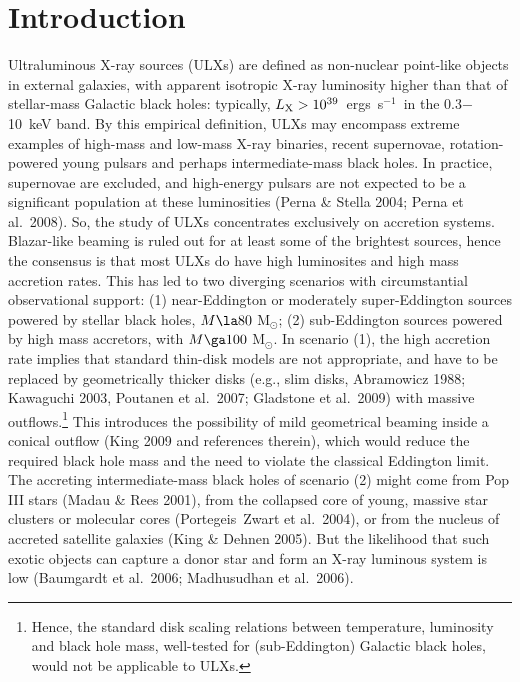 \documentclass{article}
\newcommand{\msun}{M$_{\odot}$}
\newcommand{\ergl}{ergs~s$^{-1}$}
\newcommand{\etal}{et al.}
\begin{document}

\section{Introduction}

Ultraluminous X-ray sources (ULXs) 
 are defined as non-nuclear point-like objects in external galaxies,
with apparent isotropic X-ray luminosity higher than that of stellar-mass
Galactic black holes: typically, $L_{\rm X} > 10^{39}$~\ergl\
in the 0.3$-$10~keV band. By this empirical definition, ULXs
may encompass extreme examples of high-mass and low-mass X-ray
binaries, recent supernovae, rotation-powered young pulsars
and perhaps intermediate-mass black holes. In practice, supernovae
are excluded, and high-energy pulsars are not expected to be a significant
population at these luminosities (Perna \& Stella 2004; Perna \etal\ 2008). 
So, the study of ULXs concentrates
exclusively on accretion systems. Blazar-like beaming is ruled out
for at least some of the brightest sources,
hence the consensus is that most ULXs do have high luminosites
and high mass accretion rates. This has led to two diverging scenarios
with circumstantial observational support: 
(1) near-Eddington or moderately super-Eddington sources powered
by stellar black holes, $M \la 80$ \msun;
(2) sub-Eddington sources
powered by high mass accretors, with $M \ga 100$ \msun.
%
In scenario (1), the high accretion rate implies that
standard thin-disk models are not appropriate, and have to be
replaced by geometrically thicker disks (e.g., slim disks, Abramowicz 1988; Kawaguchi 2003,
 Poutanen \etal\ 2007; Gladstone \etal\ 2009)
with massive 
outflows.\footnote{Hence, the standard disk scaling relations between temperature, luminosity
and black hole mass, well-tested for (sub-Eddington) Galactic black holes,
would not be applicable to ULXs.}
%
This introduces the possibility of mild
geometrical beaming inside a conical outflow (King 2009 and references therein), which
would reduce the required black hole mass and the need to violate
the classical Eddington limit.
%
The accreting intermediate-mass black holes
of scenario (2) might come from Pop III stars (Madau \& Rees 2001), from the collapsed
core of young, massive star clusters or molecular cores (Portegeis~Zwart \etal\ 2004),
or from the nucleus of accreted satellite galaxies (King \& Dehnen 2005).
But the likelihood that such exotic objects can capture a donor
star and form an X-ray luminous system is low (Baumgardt \etal\ 2006; Madhusudhan \etal\ 2006).
\end{document}
